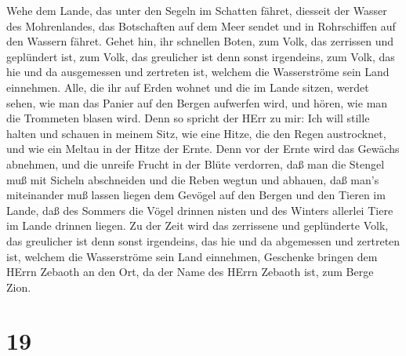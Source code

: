  Wehe dem Lande, das unter den Segeln im Schatten fähret,
diesseit der Wasser des Mohrenlandes,  das Botschaften auf
dem Meer sendet und in Rohrschiffen auf den Wassern fähret. Gehet hin,
ihr schnellen Boten, zum Volk, das zerrissen und geplündert ist, zum
Volk, das greulicher ist denn sonst irgendeins, zum Volk, das hie und da
ausgemessen und zertreten ist, welchem die Wasserströme sein Land
einnehmen.  Alle, die ihr auf Erden wohnet und die im Lande
sitzen, werdet sehen, wie man das Panier auf den Bergen aufwerfen wird,
und hören, wie man die Trommeten blasen wird.  Denn so
spricht der HErr zu mir: Ich will stille halten und schauen in meinem
Sitz, wie eine Hitze, die den Regen austrocknet, und wie ein Meltau in
der Hitze der Ernte.  Denn vor der Ernte wird das Gewächs
abnehmen, und die unreife Frucht in der Blüte verdorren, daß man die
Stengel muß mit Sicheln abschneiden und die Reben wegtun und abhauen,
 daß man's miteinander muß lassen liegen dem Gevögel auf den
Bergen und den Tieren im Lande, daß des Sommers die Vögel drinnen nisten
und des Winters allerlei Tiere im Lande drinnen liegen.  Zu
der Zeit wird das zerrissene und geplünderte Volk, das greulicher ist
denn sonst irgendeins, das hie und da abgemessen und zertreten ist,
welchem die Wasserströme sein Land einnehmen, Geschenke bringen dem
HErrn Zebaoth an den Ort, da der Name des HErrn Zebaoth ist, zum Berge
Zion.

\hypertarget{section-18}{%
\section{19}\label{section-18}}

